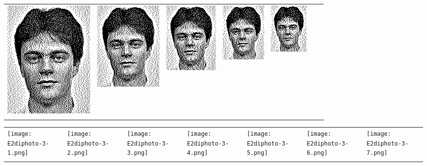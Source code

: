 \begin{tabular}{lllllll}
	\includegraphics{Ediphoto-3-3.png} &
	\includegraphics{Ediphoto-3-4.png} &
	\includegraphics{Ediphoto-3-5.png} &
	\includegraphics{Ediphoto-3-6.png} &
	\includegraphics{Ediphoto-3-7.png} \\
	 &
	 &
	 &
	 &
	 &
	 &
	 \\
\end{tabular}
\begin{tabular}{lllllll}
	\texttt{[image: E2diphoto-3-1.png]} &
	\texttt{[image: E2diphoto-3-2.png]} &
	\texttt{[image: E2diphoto-3-3.png]} &
	\texttt{[image: E2diphoto-3-4.png]} &
	\texttt{[image: E2diphoto-3-5.png]} &
	\texttt{[image: E2diphoto-3-6.png]} &
	\texttt{[image: E2diphoto-3-7.png]} \\
	 &
	 &
	 &
	 &
	 &
	 &
	 \\
\end{tabular}

